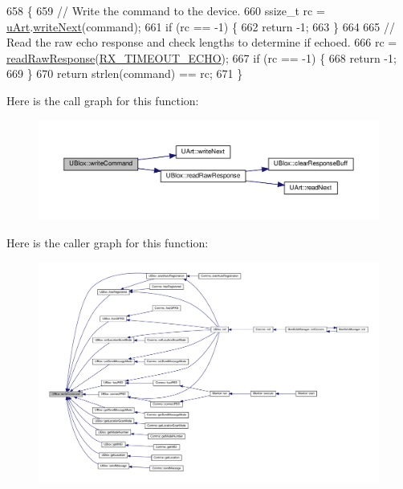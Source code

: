 \begin{DoxyCode}
658 \{
659     \textcolor{comment}{// Write the command to the device.}
660     ssize\_t rc = \hyperlink{class_u_blox_a034c0463d1c199d094d657c8ebb151e8}{uArt}.\hyperlink{class_u_art_aad1ddb133fe430a92527584eec2e674f}{writeNext}(command);
661     \textcolor{keywordflow}{if} (rc == -1) \{
662         \textcolor{keywordflow}{return} -1;
663     \}
664 
665     \textcolor{comment}{// Read the raw echo response and check lengths to determine if echoed.}
666     rc = \hyperlink{class_u_blox_ab4a7ab4b8922d91e23f273ae160c1bed}{readRawResponse}(\hyperlink{_u_blox_8cpp_a55092c0742d15bb08a5ea7db5a25440e}{RX\_TIMEOUT\_ECHO});
667     \textcolor{keywordflow}{if} (rc == -1) \{
668         \textcolor{keywordflow}{return} -1;
669     \}
670     \textcolor{keywordflow}{return} strlen(command) == rc;
671 \}
\end{DoxyCode}
Here is the call graph for this function\+:
\nopagebreak
\begin{figure}[H]
\begin{center}
\leavevmode
\includegraphics[width=350pt]{da/df6/class_u_blox_af604d1897a66192bf1c2a11997f2634d_cgraph}
\end{center}
\end{figure}
Here is the caller graph for this function\+:
\nopagebreak
\begin{figure}[H]
\begin{center}
\leavevmode
\includegraphics[width=350pt]{da/df6/class_u_blox_af604d1897a66192bf1c2a11997f2634d_icgraph}
\end{center}
\end{figure}


